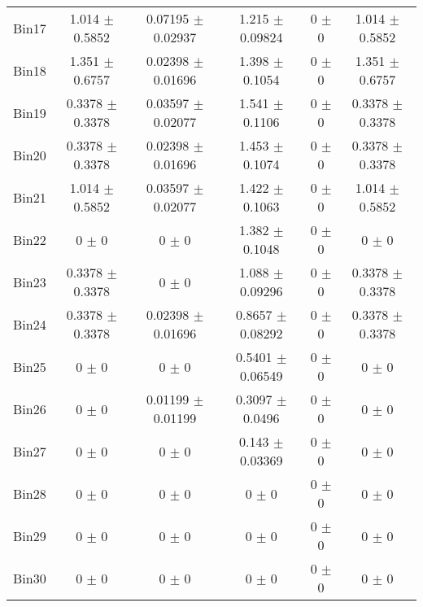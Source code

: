 \begin{tabular}{@{\extracolsep{4pt}}lccccc@{}}
     Bin17 & 1.014 $\pm$ 0.5852 & 0.07195 $\pm$ 0.02937 & 1.215 $\pm$ 0.09824 & 0 $\pm$ 0 & 1.014 $\pm$ 0.5852 \\ 
     Bin18 & 1.351 $\pm$ 0.6757 & 0.02398 $\pm$ 0.01696 & 1.398 $\pm$ 0.1054 & 0 $\pm$ 0 & 1.351 $\pm$ 0.6757 \\ 
     Bin19 & 0.3378 $\pm$ 0.3378 & 0.03597 $\pm$ 0.02077 & 1.541 $\pm$ 0.1106 & 0 $\pm$ 0 & 0.3378 $\pm$ 0.3378 \\ 
     Bin20 & 0.3378 $\pm$ 0.3378 & 0.02398 $\pm$ 0.01696 & 1.453 $\pm$ 0.1074 & 0 $\pm$ 0 & 0.3378 $\pm$ 0.3378 \\ 
     Bin21 & 1.014 $\pm$ 0.5852 & 0.03597 $\pm$ 0.02077 & 1.422 $\pm$ 0.1063 & 0 $\pm$ 0 & 1.014 $\pm$ 0.5852 \\ 
     Bin22 & 0 $\pm$ 0 & 0 $\pm$ 0 & 1.382 $\pm$ 0.1048 & 0 $\pm$ 0 & 0 $\pm$ 0 \\ 
     Bin23 & 0.3378 $\pm$ 0.3378 & 0 $\pm$ 0 & 1.088 $\pm$ 0.09296 & 0 $\pm$ 0 & 0.3378 $\pm$ 0.3378 \\ 
     Bin24 & 0.3378 $\pm$ 0.3378 & 0.02398 $\pm$ 0.01696 & 0.8657 $\pm$ 0.08292 & 0 $\pm$ 0 & 0.3378 $\pm$ 0.3378 \\ 
     Bin25 & 0 $\pm$ 0 & 0 $\pm$ 0 & 0.5401 $\pm$ 0.06549 & 0 $\pm$ 0 & 0 $\pm$ 0 \\ 
     Bin26 & 0 $\pm$ 0 & 0.01199 $\pm$ 0.01199 & 0.3097 $\pm$ 0.0496 & 0 $\pm$ 0 & 0 $\pm$ 0 \\ 
     Bin27 & 0 $\pm$ 0 & 0 $\pm$ 0 & 0.143 $\pm$ 0.03369 & 0 $\pm$ 0 & 0 $\pm$ 0 \\ 
     Bin28 & 0 $\pm$ 0 & 0 $\pm$ 0 & 0 $\pm$ 0 & 0 $\pm$ 0 & 0 $\pm$ 0 \\ 
     Bin29 & 0 $\pm$ 0 & 0 $\pm$ 0 & 0 $\pm$ 0 & 0 $\pm$ 0 & 0 $\pm$ 0 \\ 
     Bin30 & 0 $\pm$ 0 & 0 $\pm$ 0 & 0 $\pm$ 0 & 0 $\pm$ 0 & 0 $\pm$ 0 \\ 
\hline\hline
  \end{tabular}
